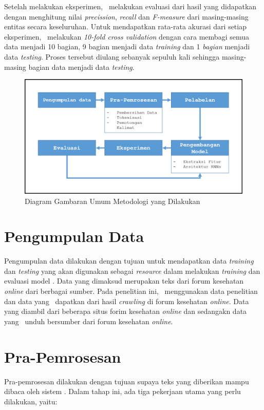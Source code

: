 Setelah melakukan eksperimen, \saya~melakukan evaluasi dari hasil yang didapatkan dengan menghitung nilai \textit{precission}, \textit{recall} dan \textit{F-measure} dari masing-masing entitas secara keseluruhan. Untuk mendapatkan rata-rata akurasi dari setiap eksperimen, \saya~melakukan \textit{10-fold cross validation} dengan cara membagi semua data menjadi 10 bagian, 9 bagian menjadi data \textit{training} dan 1 \textit{bagian} menjadi data \textit{testing}. Proses tersebut diulang sebanyak sepuluh kali sehingga masing-masing bagian data menjadi data \textit{testing}.
\begin{figure}
  \centering
  \includegraphics[width=\linewidth]{images/arsitektur}
  \caption{Diagram Gambaran Umum Metodologi yang Dilakukan}
  \label{fig:metodologi_penelitian}
\end{figure}

\section{Pengumpulan Data}
Pengumpulan data dilakukan dengan tujuan untuk mendapatkan data \textit{training} dan \textit{testing} yang akan digunakan sebagai \textit{resource} dalam melakukan \textit{training} dan evaluasi model \mer. Data yang dimaksud merupakan teks dari forum kesehatan \textit{online} dari berbagai sumber. Pada penelitian ini, \saya~menggunakan data penelitian \cite{skripsiKakRadit} dan data yang \saya~dapatkan dari hasil \textit{crawling} di forum kesehatan \textit{online}. Data yang \cite{skripsiKakRadit} diambil dari beberapa situs forim kesehatan \textit{online} dan sedangakn data yang \saya~unduh bersumber dari forum kesehatan \textit{online}.

\section{Pra-Pemrosesan}
Pra-pemrosesan dilakukan dengan tujuan supaya teks yang diberikan mampu dibaca oleh sistem \mer. Dalam tahap ini, ada tiga pekerjaan utama yang perlu dilakukan, yaitu:

